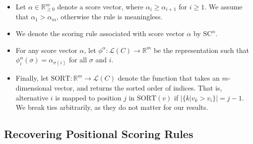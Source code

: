 \documentclass[10pt,letterpaper]{article}
\newcommand{\calL}{{\mathcal{L}}}
\newcommand{\scr}{{\text{SC}}}
\newcommand{\rank}{{\calL(C)}}
\newcommand{\sca}{{\scr^{\alpha}}}
\newcommand{\sort}{\text{SORT}}
\newcommand{\phia}{\phi^{\alpha}}
\begin{document}
\begin{itemize}
\item Let $\alpha \in \mathbb{R}_{\ge 0}^m$ denote a score vector, where $\alpha_i \ge \alpha_{i+1}$ for $i \ge 1$. We assume that $\alpha_1 > \alpha_m$, otherwise the rule is meaningless.
\item We denote the scoring rule associated with score vector $\alpha$ by $\sca$. 
\item For any score vector $\alpha$, let $\phia: \rank \rightarrow \mathbb{R}^m$ be the representation such that $\phia_i(\sigma) = \alpha_{\sigma(i)}$ for all $\sigma$ and $i$.
\item Finally, let $\sort : \mathbb{R}^m \rightarrow \rank$ denote the function that takes an $m$-dimensional vector, and returns the sorted order of indices. That is, alternative $i$ is mapped to position $j$ in $\sort(v)$ if $|\{k | v_k > v_i\}| = j-1$. We break ties arbitrarily, as they do not matter for our results. %
\end{itemize}

\subsection{Recovering Positional Scoring Rules}
\end{document}
